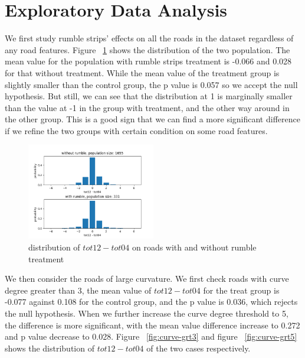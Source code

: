 \documentclass{article}
\begin{document}
\section*{Exploratory Data Analysis}

We first study rumble strips' effects on all the roads in the dataset regardless of any road features. Figure ~\ref{fig:general-effect} shows the distribution of the two population. The mean value for the population with rumble strips treatment is -0.066 and 0.028 for that without treatment. While the mean value of the treatment group is slightly smaller than the control group, the p value is 0.057 so we accept the null hypothesis. But still, we can see that the distribution at 1 is marginally smaller than the value at -1 in the group with treatment, and the other way around in the other group. This is a good sign that we can find a more significant difference if we refine the two groups with certain condition on some road features.

\begin{figure}[h!]
    \centering
    \includegraphics[width=0.5\textwidth]{with-and-without-rumble-diff.png}
    \caption{distribution of $tot12-tot04$ on roads with and without rumble treatment}
    \label{fig:general-effect}
\end{figure}

We then consider the roads of large curvature. We first check roads with curve degree greater than 3, the mean value of $tot12-tot04$ for the treat group is -0.077 against 0.108 for the control group, and the p value is 0.036, which rejects the null hypothesis. When we further increase the curve degree threshold to 5, the difference is more significant, with the mean value difference increase to 0.272 and p value decrease to 0.028. Figure ~\ref{fig:curve-grt3} and figure ~\ref{fig:curve-grt5} shows the distribution of $tot12-tot04$ of the two cases respectively. 
\end{document}
